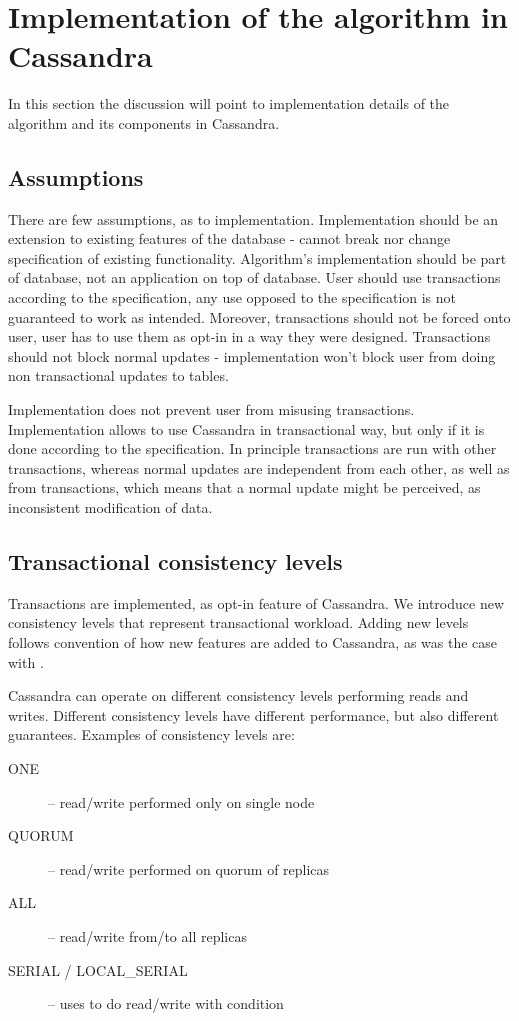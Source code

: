 
\chapter{Implementation of the algorithm in Cassandra}\label{sec:mpp:impl}
In this section the discussion will point to implementation details of the algorithm and its components in Cassandra. 


\section{Assumptions}
There are few assumptions, as to implementation.
Implementation should be an extension to existing features of the database - cannot break nor change specification of existing functionality. Algorithm’s implementation should be part of database, not an application on top of database. User should use transactions according to the specification, any use opposed to the specification is not guaranteed to work as intended. Moreover, transactions should not be forced onto user, user has to use them as opt-in in a way they were designed. Transactions should not block normal updates - implementation won’t block user from doing non transactional updates to tables.

Implementation does not prevent user from misusing transactions. Implementation allows to use Cassandra in transactional way, but only if it is done according to the specification. In principle transactions are run with other transactions, whereas normal updates are independent from each other, as well as from transactions, which means that a normal update might be perceived, as inconsistent modification of data.

\section{Transactional consistency levels}
Transactions are implemented, as opt-in feature of Cassandra. We introduce new consistency levels that represent transactional workload. Adding new levels follows convention of how new features are added to Cassandra, as was the case with \lwt. 
 
Cassandra can operate on different consistency levels performing reads and writes. Different consistency levels have different performance, but also different guarantees. Examples of consistency levels are:
\begin{description}
\item[ONE] -- read/write performed only on single node
\item[QUORUM] -- read/write performed on quorum of replicas
\item[ALL] -- read/write from/to all replicas
\item[SERIAL / LOCAL_SERIAL] -- uses \lwt to do read/write with condition
\end{description}

